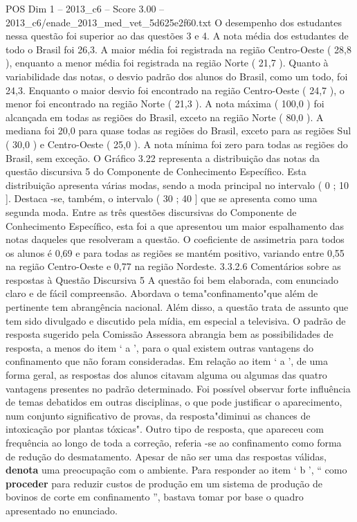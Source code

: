 \begin{textsample}{POS Dim 1 – 2013\_c6 – Score 3.00 – 2013\_c6/enade\_2013\_med\_vet\_5d625e2f60.txt}
O desempenho dos estudantes nessa questão foi superior ao das questões 3 e 4.
A nota média dos estudantes de todo o Brasil foi 26,3.
A maior média foi registrada na região Centro-Oeste ( 28,8 ), enquanto a menor média foi registrada na região Norte ( 21,7 ).
Quanto à variabilidade das notas, o desvio padrão dos alunos do Brasil, como um todo, foi 24,3.
Enquanto o maior desvio foi encontrado na região Centro-Oeste ( 24,7 ), o menor foi encontrado na região Norte ( 21,3 ).
A nota máxima ( 100,0 ) foi alcançada em todas as regiões do Brasil, exceto na região Norte ( 80,0 ).
A mediana foi 20,0 para quase todas as regiões do Brasil, exceto para as regiões Sul ( 30,0 ) e Centro-Oeste ( 25,0 ).
A nota mínima foi zero para todas as regiões do Brasil, sem exceção.
O Gráfico 3.22 representa a distribuição das notas da questão discursiva 5 do Componente de Conhecimento Específico.
Esta distribuição apresenta várias modas, sendo a moda principal no intervalo ( 0 ; 10 ].
Destaca -se, também, o intervalo ( 30 ; 40 ] que se apresenta como uma segunda moda.
Entre as três questões discursivas do Componente de Conhecimento Específico, esta foi a que apresentou um maior espalhamento das notas daqueles que resolveram a questão.
O coeficiente de assimetria para todos os alunos é 0,69 e para todas as regiões se mantém positivo, variando entre 0,55 na região Centro-Oeste e 0,77 na região Nordeste. 3.3.2.6 Comentários sobre as respostas à Questão Discursiva 5 A questão foi bem elaborada, com enunciado claro e de fácil compreensão.
Abordava o tema"confinamento"que além de pertinente tem abrangência nacional.
Além disso, a questão trata de assunto que tem sido divulgado e discutido pela mídia, em especial a televisiva.
O padrão de resposta sugerido pela Comissão Assessora abrangia bem as possibilidades de resposta, a menos do item ‘ a ’, para o qual existem outras vantagens do confinamento que não foram consideradas.
Em relação ao item ‘ a ’, de uma forma geral, as respostas dos alunos citavam alguma ou algumas das quatro vantagens presentes no padrão determinado.
Foi possível observar forte influência de temas debatidos em outras disciplinas, o que pode justificar o aparecimento, num conjunto significativo de provas, da resposta"diminui as chances de intoxicação por plantas tóxicas".
Outro tipo de resposta, que apareceu com frequência ao longo de toda a correção, referia -se ao confinamento como forma de redução do desmatamento.
Apesar de não ser uma das respostas válidas, \textbf{denota} uma preocupação com o ambiente.
Para responder ao item ‘ b ’, “ como \textbf{proceder} para reduzir custos de produção em um sistema de produção de bovinos de corte em confinamento ”, bastava tomar por base o quadro apresentado no enunciado.

\end{textsample}
